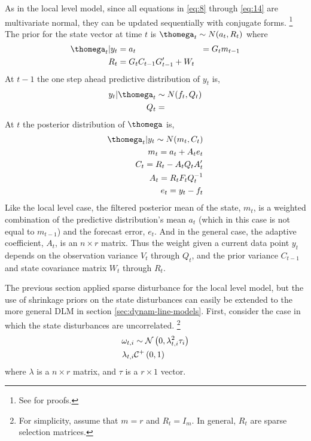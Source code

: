 \documentclass{article}
\begin{document}
As in the local level model, since all equations in \eqref{eq:8} through \eqref{eq:14} are multivariate normal, they can be updated sequentially with conjugate forms.%
\footnote{See \textcite[Section 4.3][]{WestHarrison1997} for proofs.}
The prior for the state vector at time $t$ is $\thomega_{t} \sim N(a_{t}, R_{t})$ where
\begin{align}
  \label{eq:13}
  \thomega_{t} | y_{t} &= 
  a_{t} &= G_{t} m_{t-1} \\
  R_{t} &= G_{t} C_{t-1} G'_{t-1} + W_{t}
\end{align}
At $t-1$ the one step ahead predictive distribution of $y_{t}$ is,
\begin{align}
  \label{eq:13}
  y_{t} | \thomega_{t} & \sim N(f_{t}, Q_{t}) \\
  Q_{t} &= 
\end{align}
At $t$ the posterior distribution of $\thomega$ is,
\begin{align}
  \label{eq:15}
  \thomega_{t} | y_{t} \sim N(m_{t}, C_{t}) \\
  m_{t} = a_{t} + A_{t} e_{t} \\
  C_{t} = R_{t} - A_{t} Q_{t} A_{t}' \\
  A_{t} = R_{t} F_{t} Q^{-1}_{t} \\
  e_{t} = y_{t} - f_{t}
\end{align}
Like the local level case, the filtered posterior mean of the state,
$m_{t}$, is a weighted combination of the predictive distribution's
mean $a_{t}$ (which in this case is not equal to $m_{t-1}$) and the
forecast error, $e_{t}$.
And in the general case, the adaptive coefficient, $A_{t}$, is an $n
\times r$  matrix.
Thus the weight given a current data point $y_{t}$ depends on the
observation variance $V_{t}$ through $Q_{t}$, and the prior variance
$C_{t-1}$ and state covariance matrix $W_{t}$ through $R_{t}$.

The previous section applied sparse disturbance for the local level model, but the use of shrinkage priors on the state disturbances can easily be extended to the more general DLM in section \ref{sec:dynam-line-models}.
First, consider the case in which the state disturbances are uncorrelated.
\footnote{
  For simplicity, assume that $m = r$ and $R_{t} = I_{m}$.
  In general, $R_{t}$ are sparse selection matrices.
}
\begin{equation}
  \label{eq:20}
  \begin{aligned}[t]
    \omega_{t,i} &\sim \mathcal{N}\left(0, \lambda_{t,i}^{2} \tau_{i}\right) \\
    \lambda_{t,i} & \mathcal{C}^{+}\left(0, 1\right)
  \end{aligned}
\end{equation}
where $\lambda$ is a $n \times r$ matrix, and $\tau$ is a $r \times 1$ vector.
\end{document}
